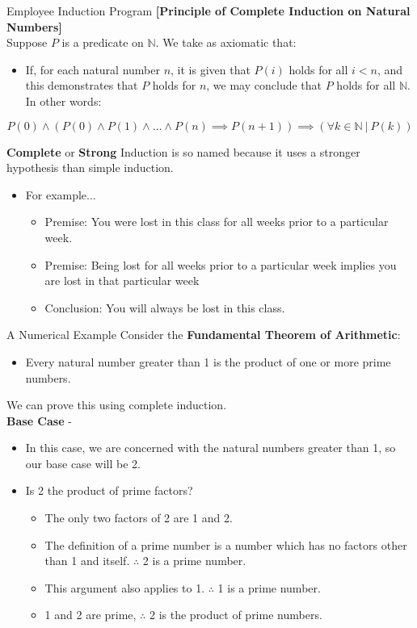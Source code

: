 \documentclass[11pt]{beamer}
\begin{document}
\begin{frame}[fragile=singleslide]{Employee Induction Program}
\textbf{[Principle of Complete Induction on Natural Numbers]} \\
Suppose $P$ is a predicate on $\mathbb{N}$.  We take as axiomatic that:
\begin{itemize}
\item If, for each natural number $n$, it is given that $P(i)$ holds for all $i < n$, and this demonstrates that $P$ holds for $n$, we may conclude that $P$ holds for all $\mathbb{N}$.  In other words:
\end{itemize}
\begin{equation}
P(0) \land (P(0) \land P(1) \land \dots \land P(n) \implies P(n+1)) \implies (\forall k \in \mathbb{N} \:|\: P(k))
\end{equation}

\textbf{Complete} or \textbf{Strong} Induction is so named because it uses a stronger hypothesis than simple induction. 
\begin{itemize}
\item For example...
\begin{itemize}
\item Premise: You were lost in this class for all weeks prior to a particular week.
\item Premise: Being lost for all weeks prior to a particular week implies you are lost in that particular week
\item Conclusion: You will always be lost in this class.  
\end{itemize}
\end{itemize}
\end{frame}

\begin{frame}[fragile=singleslide]{A Numerical Example}
Consider the \textbf{Fundamental Theorem of Arithmetic}:
\begin{itemize}
\item Every natural number greater than 1 is the product of one or more prime numbers.
\end{itemize}
We can prove this using complete induction. \\
\textbf{Base Case} -
	\begin{itemize}
	\item In this case, we are concerned with the natural numbers greater than 1, so our base case will be 2.  
	\item Is 2 the product of prime factors? 
	\begin{itemize}
	\item The only two factors of 2 are 1 and 2.  
	\item The definition of a prime number is a number which has no factors other than 1 and itself. $\therefore$ 2 is a prime number.  
	\item This argument also applies to 1. $\therefore$ 1 is a prime number.
	\item 1 and 2 are prime, $\therefore$ 2 is the product of prime numbers.  
	\end{itemize}
	\end{itemize}

\end{frame}
\end{document}
